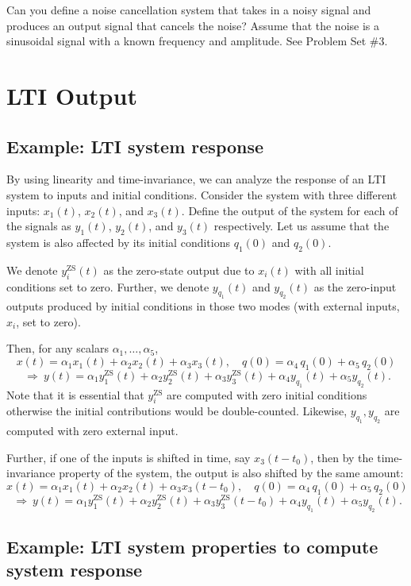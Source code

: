 \begin{popquiz}
  Can you define a noise cancellation system that takes in a noisy signal and produces an output signal that cancels the noise? Assume that the noise is a sinusoidal signal with a known frequency and amplitude. 
  \popqsplit
  See Problem Set \#3.
\end{popquiz}

\section{LTI Output}
\subsection{Example: LTI system response}
By using linearity and time-invariance, we can analyze the response of an LTI system to inputs and initial conditions. Consider the system with three different inputs: $x_1(t)$, $x_2(t)$, and $x_3(t)$. Define the output of the system for each of the signals as $y_1(t)$, $y_2(t)$, and $y_3(t)$ respectively. Let us assume that the system is also affected by its initial conditions $q_1(0)$ and $q_2(0)$. 

We denote $y_i^{\mathrm{ZS}}(t)$ as the zero-state output due to $x_i(t)$ with all initial conditions set to zero. Further, we denote $y_{q_1}(t)$ and $y_{q_2}(t)$ as the zero-input outputs produced by initial conditions in those two modes (with external inputs, $x_i$, set to zero).

Then, for any scalars $\alpha_1,\dots,\alpha_5$,
\[
x(t)=\alpha_1 x_1(t)+\alpha_2 x_2(t)+\alpha_3 x_3(t),\quad
q(0)=\alpha_4\,q_1(0)+\alpha_5\,q_2(0)
\]
\[
~\Longrightarrow~
y(t)=\alpha_1 y_1^{\mathrm{ZS}}(t)+\alpha_2 y_2^{\mathrm{ZS}}(t)+\alpha_3 y_3^{\mathrm{ZS}}(t)
      +\alpha_4 y_{q_1}(t)+\alpha_5 y_{q_2}(t).
\]
Note that it is essential that $y_i^{\mathrm{ZS}}$ are computed with zero initial conditions otherwise the initial contributions would be double-counted. Likewise, $y_{q_1},y_{q_2}$ are computed with zero external input.

Further, if one of the inputs is shifted in time, say $x_3(t-t_0)$, then by the time-invariance property of the system, the output is also shifted by the same amount:
\[
x(t)=\alpha_1 x_1(t)+\alpha_2 x_2(t)+\alpha_3 x_3(t-t_0),\quad
q(0)=\alpha_4\,q_1(0)+\alpha_5\,q_2(0)
\]
\[
~\Longrightarrow~
y(t)=\alpha_1 y_1^{\mathrm{ZS}}(t)+\alpha_2 y_2^{\mathrm{ZS}}(t)+\alpha_3 y_3^{\mathrm{ZS}}(t-t_0)
      +\alpha_4 y_{q_1}(t)+\alpha_5 y_{q_2}(t).
\]
\subsection{Example: LTI system properties to compute system response}

